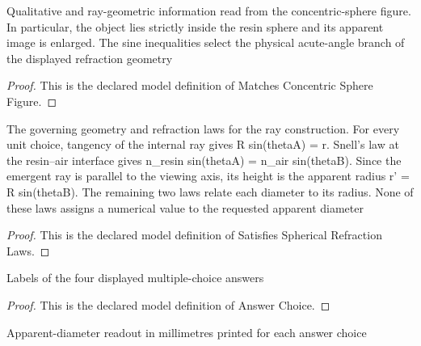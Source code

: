 \begin{definition}
  \label{def:physics:phyx-mini-0106:phyxminiproblems-problemphyxmini0106-matchesconcentricspherefigure}
  Qualitative and ray-geometric information read from the concentric-sphere figure. In particular, the object lies strictly inside the resin sphere and its apparent image is enlarged. The sine inequalities select the physical acute-angle branch of the displayed refraction geometry
\end{definition}
\begin{proof}
  This is the declared model definition of Matches Concentric Sphere Figure.
\end{proof}
\begin{definition}
  \label{def:physics:phyx-mini-0106:phyxminiproblems-problemphyxmini0106-satisfiessphericalrefractionlaws}
  The governing geometry and refraction laws for the ray construction. For every unit choice, tangency of the internal ray gives R sin(thetaA) = r. Snell's law at the resin--air interface gives n\_resin sin(thetaA) = n\_air sin(thetaB). Since the emergent ray is parallel to the viewing axis, its height is the apparent radius r' = R sin(thetaB). The remaining two laws relate each diameter to its radius. None of these laws assigns a numerical value to the requested apparent diameter
\end{definition}
\begin{proof}
  This is the declared model definition of Satisfies Spherical Refraction Laws.
\end{proof}
\begin{definition}
  \label{def:physics:phyx-mini-0106:phyxminiproblems-problemphyxmini0106-answerchoice}
  Labels of the four displayed multiple-choice answers
\end{definition}
\begin{proof}
  This is the declared model definition of Answer Choice.
\end{proof}
\begin{definition}
  \label{def:physics:phyx-mini-0106:phyxminiproblems-problemphyxmini0106-answerchoice-diametermillimeters}
  Apparent-diameter readout in millimetres printed for each answer choice
\end{definition}
